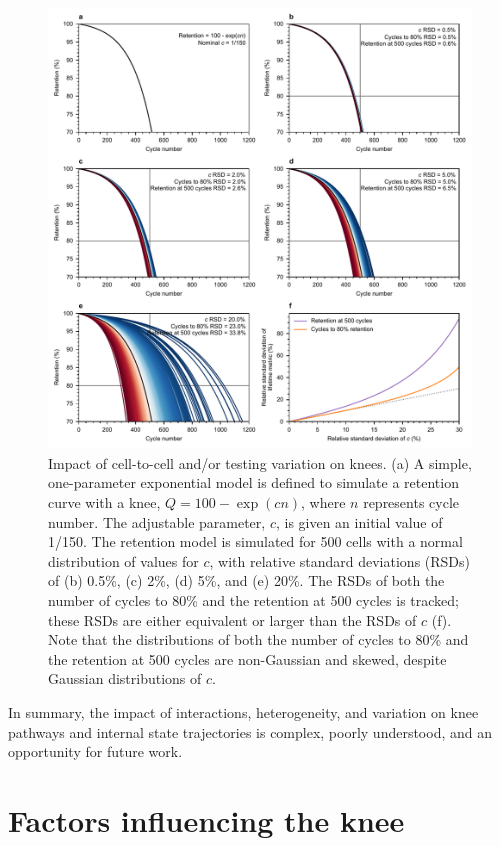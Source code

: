 \documentclass[journal=jpclcd,manuscript=article]{achemso}
\begin{document}
\begin{figure}[ht!]
\centering
\includegraphics[scale=0.7]{final_figures/variation_model.pdf}
\caption{Impact of cell-to-cell and/or testing variation on knees.
(a) A simple, one-parameter exponential model is defined to simulate a retention curve with a knee, $Q=100 - \exp(cn)$, where $n$ represents cycle number.
The adjustable parameter, $c$, is given an initial value of 1/150.
The retention model is simulated for 500 cells with a normal distribution of values for $c$, with relative standard deviations (RSDs) of (b) 0.5\%, (c) 2\%, (d) 5\%, and (e) 20\%. The RSDs of both the number of cycles to 80\% and the retention at 500 cycles is tracked; these RSDs are either equivalent or larger than the RSDs of $c$ (f).
Note that the distributions of both the number of cycles to 80\% and the retention at 500 cycles are non-Gaussian and skewed, despite Gaussian distributions of $c$.}
\label{fig:var_model}
\end{figure}

In summary, the impact of interactions, heterogeneity, and variation on knee pathways and internal state trajectories is complex, poorly understood, and an opportunity for future work.

\section{Factors influencing the knee}
\end{document}
